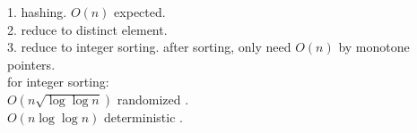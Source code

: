 \documentclass{article}
\newcommand{\Acknowledgements}[1]{\ \\{\bf Acknowledgements:} #1}
\begin{document}

1. hashing. $O(n)$ expected.\\

2. reduce to distinct element.\\

3. reduce to integer sorting. after sorting, only need $O(n)$ by monotone pointers.\\
for integer sorting:\\
$O(n\sqrt{\log\log n})$ randomized \cite{han2002sorting}.\\
$O(n\log \log n)$ deterministic \cite{han2002deterministic}.\\







\end{document}
